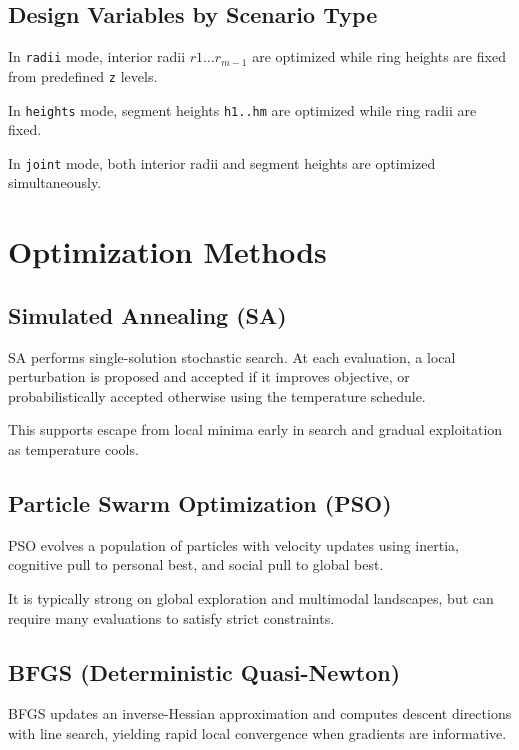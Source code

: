 \section{Design Variables by Scenario Type}

In \texttt{radii} mode, interior radii \(r1\ldots r_{m-1}\) are optimized while ring heights are fixed from predefined \texttt{z} levels.

In \texttt{heights} mode, segment heights \texttt{h1..hm} are optimized while ring radii are fixed.

In \texttt{joint} mode, both interior radii and segment heights are optimized simultaneously.


\chapter{Optimization Methods}


\section{Simulated Annealing (SA)}

SA performs single-solution stochastic search. At each evaluation, a local perturbation is proposed and accepted if it improves objective, or probabilistically accepted otherwise using the temperature schedule.

This supports escape from local minima early in search and gradual exploitation as temperature cools.


\section{Particle Swarm Optimization (PSO)}

PSO evolves a population of particles with velocity updates using inertia, cognitive pull to personal best, and social pull to global best.

It is typically strong on global exploration and multimodal landscapes, but can require many evaluations to satisfy strict constraints.


\section{BFGS (Deterministic Quasi-Newton)}

BFGS updates an inverse-Hessian approximation and computes descent directions with line search, yielding rapid local convergence when gradients are informative.

